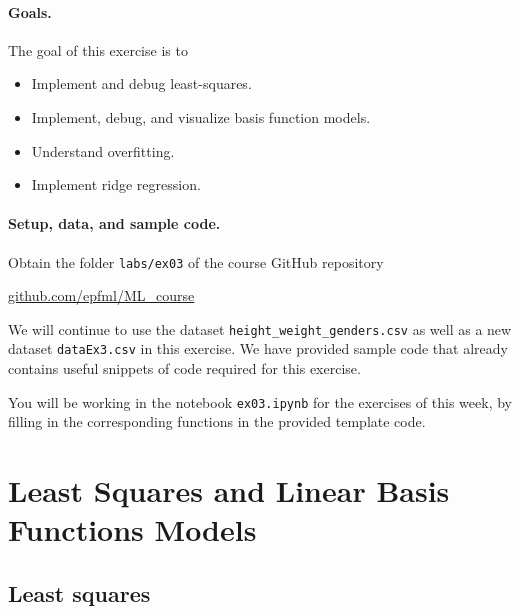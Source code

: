 \documentclass{../tex_import/ETHuebung_english}
\begin{document}

\paragraph{Goals.}
The goal of this exercise is to
\begin{itemize}
\item Implement and debug least-squares.
\item Implement, debug, and visualize basis function models.
\item Understand overfitting.
\item Implement ridge regression.
\end{itemize}

\paragraph{Setup, data, and sample code.}
Obtain the folder {\tt labs/ex03} of the course GitHub repository
\begin{center}
\href{https://github.com/epfml/ML\_course/tree/main/labs/ex03}{github.com/epfml/ML\_course}
\end{center}
We will continue to use the dataset {\tt height\_weight\_genders.csv}
as well as a new dataset {\tt dataEx3.csv} in this exercise.
We have provided sample code that already contains useful snippets of code
required for this exercise.

You will be working in the notebook {\tt ex03.ipynb} for the exercises of this week,
by filling in the corresponding functions in the provided template code.

\section{Least Squares and Linear Basis Functions Models}
\subsection{Least squares}
\end{document}
